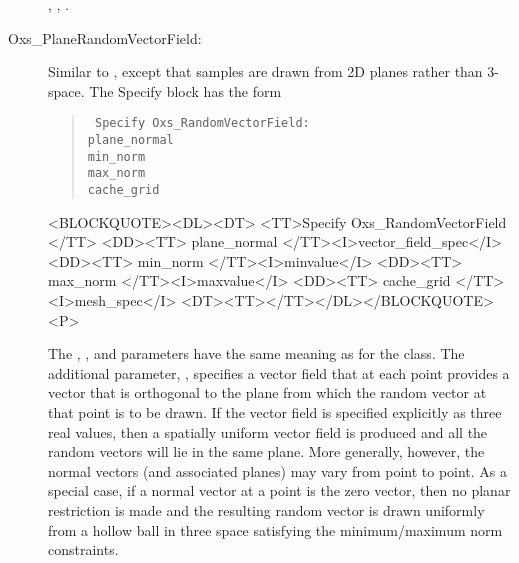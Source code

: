 \begin{description}
\begin{ExampleMifs}
  , , 
  .
\end{ExampleMifs}

%
\item[Oxs\_PlaneRandomVectorField:]
   Similar to , except that samples are
   drawn from 2D planes rather than 3-space.  The Specify block has the
   form
      \begin{latexonly}
      \begin{quote}\tt
      Specify Oxs\_RandomVectorField: \ocb\\
       \bi plane\_normal \\
       \bi min\_norm \\
       \bi max\_norm \\
       \bi cache\_grid \\
      \ccb
      \end{quote}
      \end{latexonly}
      \begin{rawhtml}
      <BLOCKQUOTE><DL><DT>
      <TT>Specify Oxs_RandomVectorField {</TT>
      <DD><TT> plane_normal </TT><I>vector_field_spec</I>
      <DD><TT> min_norm </TT><I>minvalue</I>
      <DD><TT> max_norm </TT><I>maxvalue</I>
      <DD><TT> cache_grid </TT><I>mesh_spec</I>
      <DT><TT>}</TT></DL></BLOCKQUOTE><P>
      \end{rawhtml}
  The , , and
   parameters have the same meaning as for the
   class.  The additional parameter,
  , specifies a vector field that at each point
  provides a vector that is orthogonal to the plane from which the
  random vector at that point is to be drawn.  If the vector field is
  specified explicitly as three real values, then a spatially uniform
  vector field is produced and all the random vectors will lie in the
  same plane.  More generally, however, the normal vectors (and
  associated planes) may vary from point to point.  As a special case,
  if a normal vector at a point is the zero vector, then no planar
  restriction is made and the resulting random vector is drawn uniformly
  from a hollow ball in three space satisfying the minimum/maximum norm
  constraints.


\end{description}
